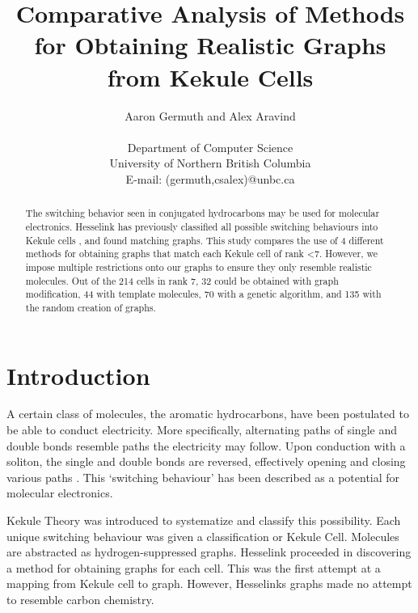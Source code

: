 \documentclass[12pt]{article}
\begin{document}
\title{Comparative Analysis of Methods for Obtaining Realistic Graphs from Kekule Cells}
\author{Aaron Germuth and Alex Aravind \\\\  
Department of Computer Science \\
University of Northern British Columbia \\
E-mail: (germuth,csalex)@unbc.ca}
\maketitle


\begin{abstract}

The switching behavior seen in conjugated hydrocarbons may be used for molecular electronics. Hesselink has previously classified all possible switching behaviours into Kekule cells \cite{H13}, and found matching graphs. This study compares the use of 4 different methods for obtaining graphs that match each Kekule cell of rank \textless  7. However, we impose multiple restrictions onto our graphs to ensure they only resemble realistic molecules. Out of the 214 cells in rank 7, 32 could be obtained with graph modification, 44 with template molecules, 70 with a genetic algorithm, and 135 with the random creation of graphs. 

\end{abstract}

\section{Introduction}

A certain class of molecules, the aromatic hydrocarbons, have been postulated to be able to conduct electricity. More specifically, alternating paths of single and double bonds resemble paths the electricity may follow. Upon conduction with a soliton, the single and double bonds are reversed, effectively opening and closing various paths \cite{HK88}. This ‘switching behaviour’ has been described as a potential for molecular electronics. 

Kekule Theory was introduced to systematize and classify this possibility. Each unique switching behaviour was given a classification or Kekule Cell. Molecules are abstracted as hydrogen-suppressed graphs. Hesselink proceeded in discovering a method for obtaining graphs for each cell. This was the first attempt at a mapping from Kekule cell to graph. However, Hesselinks graphs made no attempt to resemble carbon chemistry. 
\end{document}
